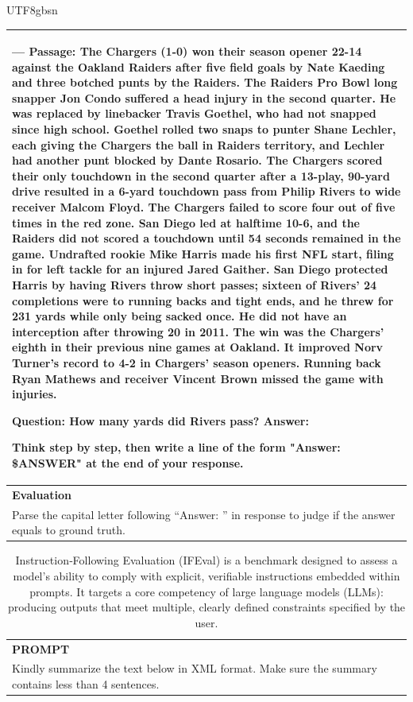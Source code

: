\documentclass[11pt, a4paper, logo, copyright, nonumbering]{deepseek}
\begin{document}
\begin{CJK*}{UTF8}{gbsn}
\begin{table}[h]
\begin{tabular}{p{}}
---
Passage:  The Chargers (1-0) won their season opener 22-14 against the Oakland Raiders after five field goals by Nate Kaeding and three botched punts by the Raiders. The Raiders Pro Bowl long snapper Jon Condo suffered a head injury in the second quarter. He was replaced by linebacker Travis Goethel, who had not snapped since high school. Goethel rolled two snaps to punter Shane Lechler, each giving the Chargers the ball in Raiders territory, and Lechler had another punt blocked by Dante Rosario. The Chargers scored their only touchdown in the second quarter after a 13-play, 90-yard drive resulted in a 6-yard touchdown pass from Philip Rivers to wide receiver Malcom Floyd. The Chargers failed to score four out of five times in the red zone. San Diego led at halftime 10-6, and the Raiders did not scored a touchdown until 54 seconds remained in the game. Undrafted rookie Mike Harris made his first NFL start, filing in for left tackle for an injured Jared Gaither. San Diego protected Harris by having Rivers throw short passes; sixteen of Rivers' 24 completions were to running backs and tight ends, and he threw for 231 yards while only being sacked once. He did not have an interception after throwing 20 in 2011. The win was the Chargers' eighth in their previous nine games at Oakland. It improved Norv Turner's record to 4-2 in Chargers' season openers. Running back Ryan Mathews and receiver Vincent Brown missed the game with injuries.

Question: How many yards did Rivers pass?
Answer: 

Think step by step, then write a line of the form "Answer: \$ANSWER" at the end of your response. \\ \hline
      \textbf{Evaluation}\\
      Parse the capital letter following ``Answer: '' in response to judge if the answer equals to ground truth. \\ \hline
    \end{tabular}
\end{table}

\begin{table}[h]
    \centering \small
        \caption{Instruction‑Following Evaluation (IFEval) is a benchmark designed to assess a model’s ability to comply with explicit, verifiable instructions embedded within prompts. It targets a core competency of large language models (LLMs): producing outputs that meet multiple, clearly defined constraints specified by the user.}
    \label{tab:ifeval_eval_format_example}
    \begin{tabular}{p{}}
    \hline
    \textbf{PROMPT}\\
    Kindly summarize the text below in XML format. Make sure the summary contains less than 4 sentences.


\end{tabular}
\end{table}
\end{CJK*}
\end{document}
